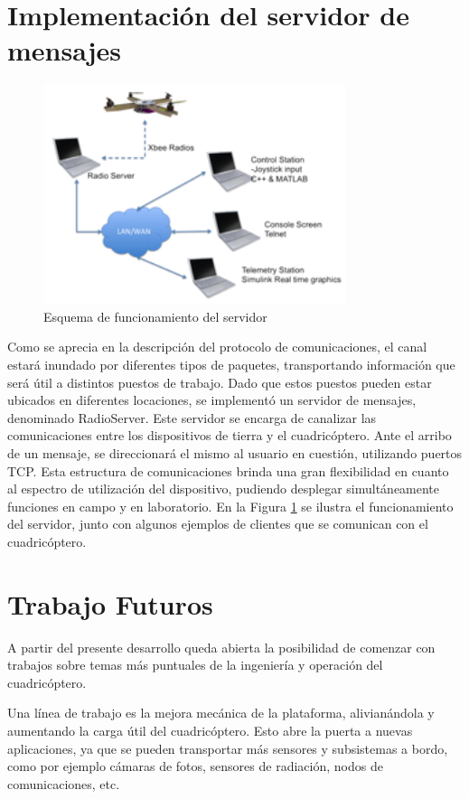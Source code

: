 \documentclass[a4paper, conference]{IEEEtran}
\begin{document}
\section{Implementación del servidor de mensajes}

\begin{figure}[t]
\centering
\includegraphics[width=3.49in]{server}
\caption{Esquema de funcionamiento del servidor}
\label{ref:server}
\end{figure}
 
Como se aprecia en la descripción del protocolo de comunicaciones, el canal estará inundado por diferentes tipos de paquetes, transportando información que será útil a distintos puestos de trabajo. Dado que estos puestos pueden estar ubicados en diferentes locaciones, se implementó un servidor de mensajes, denominado RadioServer. Este servidor se encarga de canalizar las comunicaciones entre los dispositivos de tierra y el cuadricóptero. Ante el arribo de un mensaje, se direccionará el mismo al usuario en cuestión, utilizando puertos TCP. Esta estructura de comunicaciones brinda una gran flexibilidad en cuanto al espectro de utilización del dispositivo, pudiendo desplegar simultáneamente funciones en campo y en laboratorio.
En la Figura \ref{ref:server} se ilustra el funcionamiento del servidor, junto con algunos ejemplos de clientes que se comunican con el cuadricóptero.


\section{Trabajo Futuros}

A partir del presente desarrollo queda abierta la posibilidad de comenzar con trabajos sobre temas más puntuales de la ingeniería y operación del cuadricóptero. 

Una línea de trabajo es la mejora mecánica de la plataforma, alivianándola y aumentando la carga útil del cuadricóptero. Esto abre la puerta a nuevas aplicaciones, ya que se pueden transportar más sensores y subsistemas a bordo, como por ejemplo cámaras de fotos, sensores de radiación, nodos de comunicaciones, etc.
\end{document}
